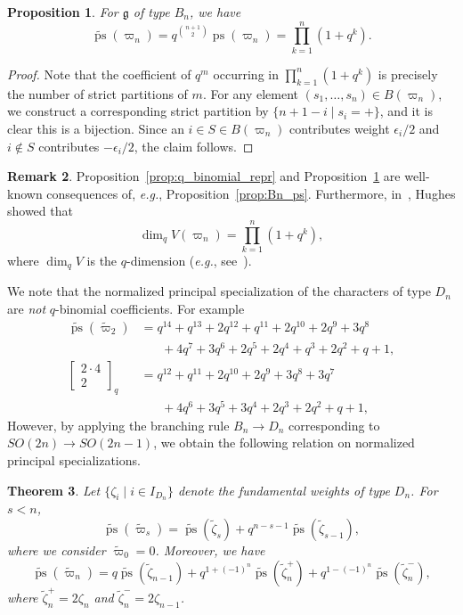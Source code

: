 \documentclass[11pt, leqno]{amsart}
\theoremstyle{plain}
\newtheorem{theorem}{Theorem}[section]
\newtheorem{proposition}[theorem]{Proposition}
\theoremstyle{definition}
\newtheorem{remark}[theorem]{Remark}
\numberwithin{equation}{section}
\newcommand{\g}{\mathfrak{g}}
\newcommand{\fw}{\varpi} %
\newcommand{\tfw}{\widetilde{\fw}} %
\newcommand{\qbinom}[3]{\left[ \begin{matrix} #1 \\ #2 \end{matrix} \right]_{#3}} %
\newcommand{\ps}{\operatorname{ps}} %
\newcommand{\nps}{\widetilde{\ps}} %
\begin{document}
\begin{proposition}
\label{prop:nps_type_B_spin}
For $\g$ of type $B_n$, we have
\[
\nps(\fw_n) = q^{\binom{n+1}{2}} \ps(\fw_n) = \prod_{k=1}^n (1 + q^k).
\]
\end{proposition}

\begin{proof}
Note that the coefficient of $q^m$ occurring in $\prod_{k=1}^n (1 + q^k)$ is precisely the number of strict partitions of $m$. For any element $(s_1, \dotsc, s_n) \in B(\fw_n)$, we construct a corresponding strict partition by $\{n+1-i \mid s_i = +\}$, and it is clear this is a bijection. Since an $i \in S \in B(\fw_n)$ contributes weight $\epsilon_i/2$ and $i \notin S$ contributes $-\epsilon_i/2$, the claim follows.
\end{proof}

\begin{remark}
Proposition~\ref{prop:q_binomial_repr} and Proposition~\ref{prop:nps_type_B_spin} are well-known consequences of, \textit{e.g.}, Proposition~\ref{prop:Bn_ps}.
Furthermore, in~\cite[Sec.~3]{Hughes77}, Hughes showed that
\[
\dim_q V(\fw_n) = \prod_{k=1}^n (1 + q^k),
\]
where $\dim_q V$ is the $q$-dimension (\textit{e.g.}, see~\cite[Sec.~10]{kac90}).
\end{remark}

We note that the normalized principal specialization of the characters of type $D_n$ are \emph{not} $q$-binomial coefficients. For example
\begin{align*}
\nps(\tfw_2) & = q^{14} + q^{13} + 2 q^{12} + q^{11} + 2 q^{10} + 2 q^9 + 3 q^8 \\
   & \hspace{20pt} + 4 q^7 + 3 q^6 + 2 q^5 + 2 q^4 + q^3 + 2 q^2 + q + 1, \\
\qbinom{2\cdot4}{2}{q} & = q^{12} + q^{11} + 2 q^{10} + 2 q^9 + 3 q^8 + 3 q^7 \\
  & \hspace{20pt} + 4 q^6 + 3 q^5 + 3 q^4 + 2 q^3 + 2 q^2 + q + 1,
\end{align*}
However, by applying the branching rule $B_n \to D_n$ corresponding to $SO(2n) \to SO(2n-1)$, we obtain the following relation on normalized principal specializations.

\begin{theorem}
Let $\{\zeta_i \mid i \in I_{D_n} \}$ denote the fundamental weights of type $D_n$.
For $s < n$,
\[
\nps(\tfw_s) = \nps(\widetilde{\zeta}_s) + q^{n-s-1} \nps(\widetilde{\zeta}_{s-1}),
\]
where we consider $\tfw_0 = 0$. Moreover, we have
\[
\nps(\tfw_n)
 = q \nps(\widetilde{\zeta}_{n-1}) + q^{1+(-1)^n} \nps(\widetilde{\zeta}_n^{+}) + q^{1-(-1)^n} \nps(\widetilde{\zeta}_n^{-}),
 \]
where $\widetilde{\zeta}_n^+ = 2\zeta_n$ and $\widetilde{\zeta}_n^- = 2\zeta_{n-1}$.
\end{theorem}
\end{document}
